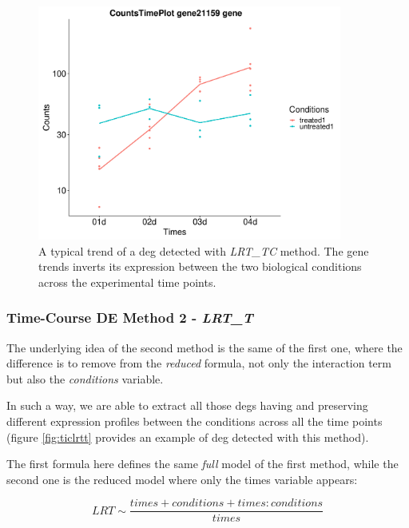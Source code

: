 \begin{figure}[H]
\centering
\includegraphics[width=10cm, keepaspectratio]{img/ticorser/de/trends/trend_LRT.pdf}
\caption[\gls{tic} LRT\_TC trend]{A typical trend of a \gls{deg} detected with \textit{LRT\_TC} method.
The gene trends inverts its expression between the two biological conditions across the experimental time points.}
\label{fig:ticlrttc}
\end{figure}

\subsubsection{Time-Course DE Method 2 - \textit{LRT\_T}}
The underlying idea of the second method is the same of the first one, where the difference is to remove from the \textit{reduced} formula, not only the interaction term but also the \textit{conditions} variable.

In such a way, we are able to extract all those \glspl{deg} having and preserving different expression profiles between the conditions across all the time points (figure \ref{fig:ticlrtt} provides an example of \gls{deg} detected with this method).

The first formula here defines the same \textit{full} model of the first method, while the second one is the reduced model where only the times variable appears:

\[LRT \sim \frac{times+conditions+times:conditions}{times}\]


